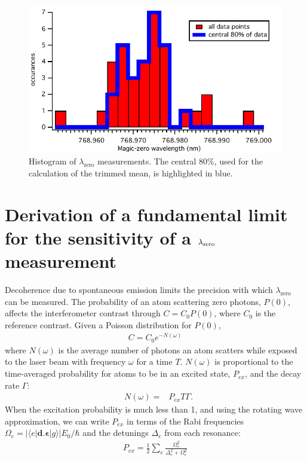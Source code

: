 \begin{figure}
\includegraphics[width=.90\textwidth]{Figures/MZWhistogram.pdf}
\caption[Histogram of $\lambda_\textrm{zero}$ measurements.]{\label{MZWhistFig}Histogram of $\lambda_\textrm{zero}$ measurements. The central 80\%, used for the calculation of the trimmed mean, is highlighted in blue.}
\end{figure}





\section{Derivation of a fundamental limit for the sensitivity of a $\lambda_\textrm{zero}$ measurement}
\label{mzwLimitSection}
Decoherence due to spontaneous emission \cite{Cha95, Kok01a} limits the precision with which $\lambda_\textrm{zero}$ can be measured. The probability of an atom scattering zero photons, $P(0)$, affects the interferometer contrast through $C=C_0P(0)$, where $C_0$ is the reference contrast. Given a Poisson distribution for $P(0)$,
\begin{eqnarray}
\label{ceqn}
C = C_0 e^{-N(\omega)}
\end{eqnarray}
where $N(\omega)$ is the average number of photons an atom scatters while exposed to the laser beam with frequency $\omega$ for a time $T$. $N(\omega)$ is proportional to the time-averaged probability for atoms to be in an excited state, $P_{ex}$, and the decay rate $\Gamma$: 
\begin{eqnarray}
&N(\omega)=&P_{ex} T \Gamma.
\end{eqnarray}
When the excitation probability is much less than 1, and using the rotating wave approximation, we can write $P_{ex}$ in terms of the Rabi frequencies $\Omega_e=|\langle e | \bm{d} . \bm{\hat{\epsilon}} | g \rangle |E_0/\hbar$ and the detunings $\Delta_e$ from each resonance:
\begin{eqnarray}
\label{PexEqn}
P_{ex}=\frac{1}{2} \sum_e \frac{\Omega_e^2}{\Delta_e^2+\Omega_e^2}
\end{eqnarray}

